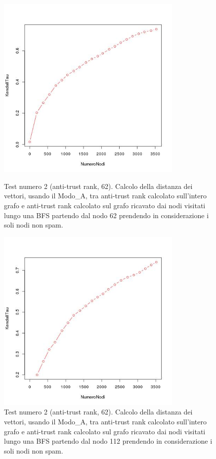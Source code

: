 \begin{figure}
\centering
 \includegraphics[height=9cm]{immagini/test2/antiTrustraktGoodNodesTestMode0_62}
 \caption{Test numero 2 (anti-trust rank, 62). Calcolo della distanza dei vettori, usando il Modo\_A, tra anti-trust rank calcolato sull'intero grafo e anti-trust rank calcolato sul grafo ricavato dai nodi visitati lungo una BFS partendo dal nodo 62 prendendo in considerazione i soli nodi non spam. }
 \label{fig:test2antitrustModoA62}
\centering
 \includegraphics[height=9cm]{immagini/test2/antiTrustraktGoodNodesTestMode0_112}
 \caption{Test numero 2 (anti-trust rank, 62). Calcolo della distanza dei vettori, usando il Modo\_A, tra anti-trust rank calcolato sull'intero grafo e anti-trust rank calcolato sul grafo ricavato dai nodi visitati lungo una BFS partendo dal nodo 112 prendendo in considerazione i soli nodi non spam. }
 \label{fig:test2antitrustModoA112}
\end{figure}

